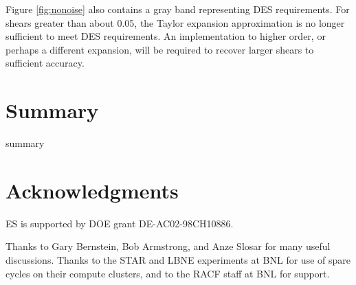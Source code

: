 \documentclass[12pt,preprint]{aastex}
\begin{document}
Figure \ref{fig:nonoise} also contains a gray band representing DES
requirements.  For shears greater than about 0.05, the Taylor expansion
approximation is no longer sufficient to meet DES requirements.  An
implementation to higher order, or perhaps a different expansion, will be
required to recover larger shears to sufficient accuracy.


\section{Summary} \label{sec:summary}

summary

\section*{Acknowledgments}

ES is supported by DOE grant DE-AC02-98CH10886.

Thanks to Gary Bernstein, Bob Armstrong, and Anze Slosar for many useful
discussions.  Thanks to the STAR and LBNE experiments at BNL for use of spare
cycles on their compute clusters, and to the RACF staff at BNL for support.




\end{document}
